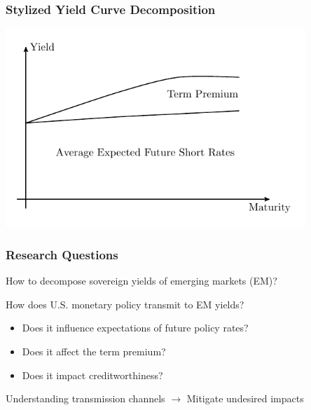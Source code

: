 \documentclass[12pt, aspectratio=169, xcolor=dvipsnames]{beamer}
\begin{document}
\begin{frame}
\frametitle{Stylized Yield Curve Decomposition}
\begin{center}
	\includegraphics[trim={0cm 0cm 0cm 0cm},clip,width=0.85\textwidth,height=0.95\textheight]{../Figures/YC/ycdcmp_AE}
\end{center}
\end{frame}


\begin{frame}
	\frametitle{Research Questions}
	How to \alert{decompose} sovereign yields of emerging markets (EM)?
	\newline
	
	How does U.S. monetary policy \alert{transmit} to EM yields?
	\begin{itemize}
		\item Does it influence expectations of future policy rates? 
		\item Does it affect the term premium?
		\item Does it impact creditworthiness?
		\newline
	\end{itemize}
	Understanding transmission channels \(\rightarrow\) \alert{Mitigate} undesired impacts
\end{frame}
\end{document}

